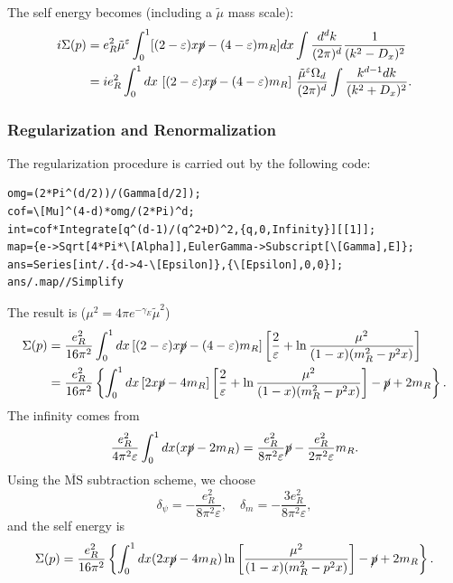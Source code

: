 \documentclass[aps,prb,superscriptaddress,nofootinbib]{revtex4}
\begin{document}
The self energy becomes (including a $\tilde \mu$ mass scale):
\begin{equation}
\begin{aligned}
	i\Sigma(p)
	&= e_R^2\tilde{\mu}^{\varepsilon} 
		\int_0^1 [(2-\varepsilon)x\cancel{p}-(4-\varepsilon)m_R] dx 
		\int \frac{d^d k}{(2\pi)^d} 
		\frac{1}{(k^2-D_x)^2} \\
	&= ie_R^2 \int_0^1 dx\ [(2-\varepsilon)x\cancel{p}-(4-\varepsilon)m_R]\ 
		\frac{\tilde{\mu}^{\varepsilon}\Omega_d}{(2\pi)^d} 
		\int \frac{k^{d-1} dk}{(k^2+D_x)^2}.
\end{aligned}
\end{equation}


\subsubsection{Regularization and Renormalization}

The regularization procedure is carried out by the following code:

\begin{lstlisting}[style=mathematicaFrameTB]
omg=(2*Pi^(d/2))/(Gamma[d/2]);
cof=\[Mu]^(4-d)*omg/(2*Pi)^d;
int=cof*Integrate[q^(d-1)/(q^2+D)^2,{q,0,Infinity}][[1]];
map={e->Sqrt[4*Pi*\[Alpha]],EulerGamma->Subscript[\[Gamma],E]};
ans=Series[int/.{d->4-\[Epsilon]},{\[Epsilon],0,0}];
ans/.map//Simplify
\end{lstlisting}

The result is ($\mu^2 = 4\pi e^{-\gamma_E} \tilde\mu^2$)
\begin{equation}
\begin{aligned}
	\Sigma(p) 
	&= \frac{e_R^2}{16\pi^2}\int_0^1 dx \left[(2-\varepsilon)x\cancel{p}-(4-\varepsilon)m_R \right] 
	\left[\frac{2}{\varepsilon}+\ln\frac{\mu^2}{(1-x)(m_R^2-p^2 x)}\right] \\
	&= \frac{e_R^2}{16\pi^2} \left\{ \int_0^1 dx \left[2x\cancel{p}-4m_R \right] 
	\left[\frac{2}{\varepsilon}+\ln\frac{\mu^2}{(1-x)(m_R^2-p^2 x)}\right]-\cancel p + 2m_R\right\}.
\end{aligned}
\end{equation}
The infinity comes from
\begin{equation}
	\frac{e_R^2}{4\pi^2\varepsilon}\int_0^1 dx(x\cancel{p}-2m_R)
	= \frac{e_R^2}{8\pi^2\varepsilon}\cancel{p} - \frac{e_R^2}{2\pi^2\varepsilon}m_R.
\end{equation}
Using the $\overline{\mathrm{MS}}$ subtraction scheme, we choose
\begin{equation}
	\delta_{\psi} = -\frac{e_R^2}{8\pi^2\varepsilon},\quad
	\delta_m = -\frac{3 e_R^2}{8\pi^2\varepsilon},
\end{equation}
and the self energy is
\begin{equation}
	\Sigma(p) 
	= \frac{e_R^2}{16\pi^2} \left\{\int_0^1 dx(2x\cancel{p}-4m_R)\ln\left[\frac{\mu^2}{(1-x)(m_R^2-p^2 x)}\right]-\cancel p + 2m_R \right\}.
\end{equation}
\end{document}
